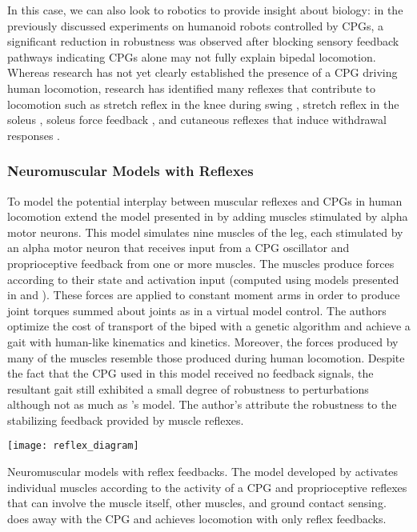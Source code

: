 In this case, we can also look to robotics to provide insight about biology: in
the previously discussed experiments on humanoid robots controlled by CPGs, a
significant reduction in robustness was observed after blocking sensory feedback
pathways \citep{endo2005experimental, righetti2006programmable} indicating CPGs
alone may not fully explain bipedal locomotion. Whereas research has not yet
clearly established the presence of a CPG driving human locomotion, research has
identified many reflexes that contribute to locomotion such as stretch reflex in
the knee during swing \citep{garrett1983role}, stretch reflex in the soleus
\citep{yang1991contribution}, soleus force feedback \citep{grey2007positive},
and cutaneous reflexes that induce withdrawal responses \citep{yang1990phase}. 

\subsubsection{Neuromuscular Models with Reflexes}
To model the potential interplay between muscular reflexes and CPGs in human
locomotion \citet{ogihara2001generation} extend the model presented in
\citet{taga1991self} by adding muscles stimulated by alpha motor neurons. This
model simulates nine muscles of the leg, each stimulated by an alpha motor
neuron that receives input from a CPG oscillator and proprioceptive feedback
from one or more muscles. The muscles produce forces according to their state
and activation input (computed using models presented in
\citet{pierrynowski1985physiological} and \citet{davy1987dynamic}). These forces
are applied to constant moment arms in order to produce joint torques summed
about joints as in a virtual model control. The authors optimize the cost of
transport of the biped with a genetic algorithm and achieve a gait with
human-like kinematics and kinetics. Moreover, the forces produced by many of the
muscles resemble those produced during human locomotion. Despite the fact that
the CPG used in this model received no feedback signals, the resultant gait
still exhibited a small degree of robustness to perturbations although not as
much as \citeauthor{taga1991self}'s model. The author's attribute the robustness
to the stabilizing feedback provided by muscle reflexes. 
\begin{marginfigure}
    \centering
    \texttt{[image: reflex\_diagram]} 
    \caption{Neuromuscular models with reflex feedbacks. The model developed by
    \citet{ogihara2001generation} activates individual muscles according to the
    activity of a CPG and proprioceptive reflexes that can involve the muscle
    itself, other muscles, and ground contact sensing.  \citet{geyer2010muscle}
    does away with the CPG and achieves locomotion with only reflex feedbacks.}
    \label{fig:reflex_diagram}
\end{marginfigure}


